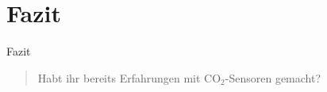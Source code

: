 \documentclass[10pt,ngerman]{beamer}
\begin{document}
\section{Fazit}
\begin{frame}[fragile]{Fazit}
  \begin{minipage}[t]{1\textwidth}
    \begin{quotation}
      Habt ihr bereits Erfahrungen mit CO$_2$-Sensoren gemacht?
    \end{quotation}
  \end{minipage}
\end{frame}






\end{document}
